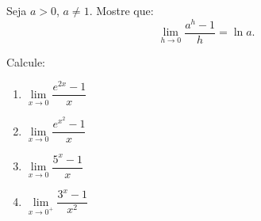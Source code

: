 \begin{exercicio}[2]
Seja $a > 0$, $a \neq 1$. Mostre que:
\[
\lim_{h \to 0} \dfrac{a^h - 1}{h} = \ln a.
\]
\end{exercicio}

\begin{exercicio}[3]
Calcule:
\begin{enumerate}[label=\alph*)]
    \item $\lim\limits_{x \to 0} \dfrac{e^{2x} - 1}{x}$
    \item $\lim\limits_{x \to 0} \dfrac{e^{x^2} - 1}{x}$
    \item $\lim\limits_{x \to 0} \dfrac{5^x - 1}{x}$
    \item $\lim\limits_{x \to 0^+} \dfrac{3^x - 1}{x^2}$
\end{enumerate}
\end{exercicio}
